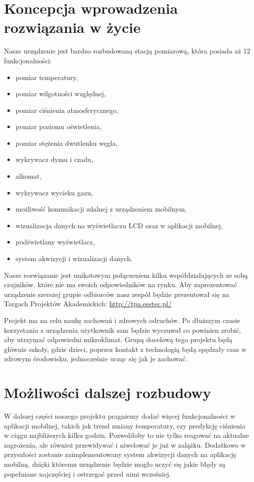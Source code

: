 \documentclass[12pt,a4paper]{article}
\begin{document}
\section{Koncepcja wprowadzenia rozwiązania w życie}
Nasze urządzenie jest bardzo rozbudowaną stacją pomiarową, która posiada aż 12 funkcjonalności:
\begin{itemize}
\item pomiar temperatury,
\item pomiar wilgotności względnej,
\item pomiar ciśnienia atmosferycznego,
\item pomiar poziomu oświetlenia,
\item pomiar stężenia dwutlenku węgla,
\item wykrywacz dymu i czadu,
\item alkomat,
\item wykrywacz wycieku gazu,
\item możliwość komunikacji zdalnej z urządzeniem mobilnym,
\item wizualizacja danych na wyświetlaczu LCD oraz w aplikacji mobilnej,
\item podświetlany wyświetlacz,
\item system akwizycji i wizualizacji danych.
\end{itemize}

Nasze rozwiązanie jest unikatowym połączeniem kilku współdziałających ze sobą czujników. które nie ma swoich odpowiedników na rynku. Aby zaprezentować urządzenie szerszej grupie odbiorców nasz zespół będzie prezentował się na Targach Projektów Akademickich: \url{http://tpa.eestec.pl/}

Projekt ma na celu naukę zachowań i zdrowych odruchów. Po dłuższym czasie korzystania z urządzenia użytkownik sam będzie wyczuwał co powinien zrobić, aby utrzymać odpowiedni mikroklimat. Grupą docelową tego projektu będą głównie szkoły, gdzie dzieci, poprzez kontakt z technologią będą spędzały czas w zdrowym środowisku, jednocześnie ucząc się jak je zachować.


\section{Możliwości dalszej rozbudowy}
W dalszej części naszego projektu pragniemy dodać więcej funkcjonalności w aplikacji mobilnej, takich jak trend zmiany temperatury, czy predykcję ciśnienia w ciągu najbliższych kilku godzin. Pozwoliłoby to nie tylko reagować na aktualne zagrożenia, ale również przewidywać i niwelować je już w zalążku.
Dodatkowo w przyszłości zostanie zaimplementowany system akwizycji danych na aplikację mobilną, dzięki któremu urządzenie będzie mogło uczyć się jakie błędy są popełniane najczęściej i ostrzegać przed nimi wcześniej.
\end{document}
